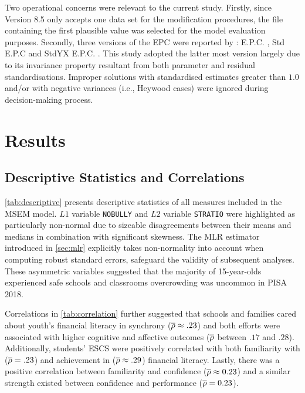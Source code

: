 \documentclass[a4paper,11pt,UKenglish,twoside,openright]{report}\usepackage[]{graphicx}\usepackage[]{color}
\begin{document}
Two operational concerns were relevant to the current study. Firstly, since \cM Version 8.5 only accepts one data set for the modification procedures, the file containing the first plausible value was selected for the model evaluation purposes. Secondly, three versions of the EPC were reported by \CM: \textsf{E.P.C.} \parencite{saris:1987}, \textsf{Std E.P.C} \parencite{kaplan:1989} and \textsf{StdYX E.P.C.} \parencite{chou:1993}. This study adopted the latter most version largely due to its invariance property resultant from both parameter and residual standardisations. Improper solutions with standardised estimates greater than $1.0$ and/or with negative variances (i.e., Heywood cases) were ignored during decision-making process.


\chapter{Results}
\label{chp:4}



\section{Descriptive Statistics and Correlations}

\cref{tab:descriptive} presents descriptive statistics of all measures included in the MSEM model. $L1$ variable \texttt{NOBULLY} and $L2$ variable \texttt{STRATIO} were highlighted as particularly non-normal due to sizeable disagreements between their means and medians in combination with significant skewness. The MLR estimator introduced in \cref{sec:mlr} explicitly takes non-normality into account when computing robust standard errors, safeguard the validity of subsequent analyses. These asymmetric variables suggested that the majority of 15-year-olds experienced safe schools and classrooms overcrowding was uncommon in PISA 2018.

Correlations in \cref{tab:correlation} further suggested that schools and families cared about youth's financial literacy in synchrony ($\overline{\rho} \approx .23$) and both efforts were associated with higher cognitive and affective outcomes ($\overline{\rho}$ between $.17$ and $.28$). Additionally, students' ESCS were positively correlated with both familiarity with ($\overline{\rho} = .23$) and achievement in ($\overline{\rho} \approx .29$) financial literacy. Lastly, there was a positive correlation between familiarity and confidence ($\overline{\rho} \approx 0.23$) and a similar strength existed between confidence and performance ($\overline{\rho} = 0.23$).
\end{document}
